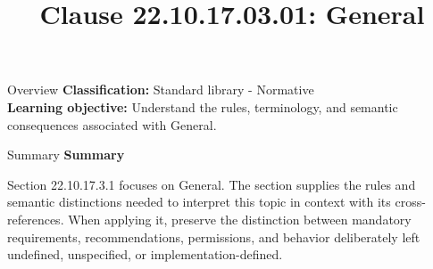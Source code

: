 \documentclass[10pt,letterpaper]{article}
\title{Clause 22.10.17.03.01: General}
\author{}
\date{}
\begin{document}
\maketitle
\begin{CornellOverviewBox}{Overview}
\textbf{Classification:} Standard library - Normative\\[2pt]
\textbf{Learning objective:} Understand the rules, terminology, and semantic consequences associated with General.
\end{CornellOverviewBox}\begin{CornellSummaryBox}{Summary}
{\sffamily\bfseries\color{Accent} Summary}\par\vspace{3pt}Section 22.10.17.3.1 focuses on General. The section supplies the rules and semantic distinctions needed to interpret this topic in context with its cross-references. When applying it, preserve the distinction between mandatory requirements, recommendations, permissions, and behavior deliberately left undefined, unspecified, or implementation-defined.
\end{CornellSummaryBox}
\end{document}
